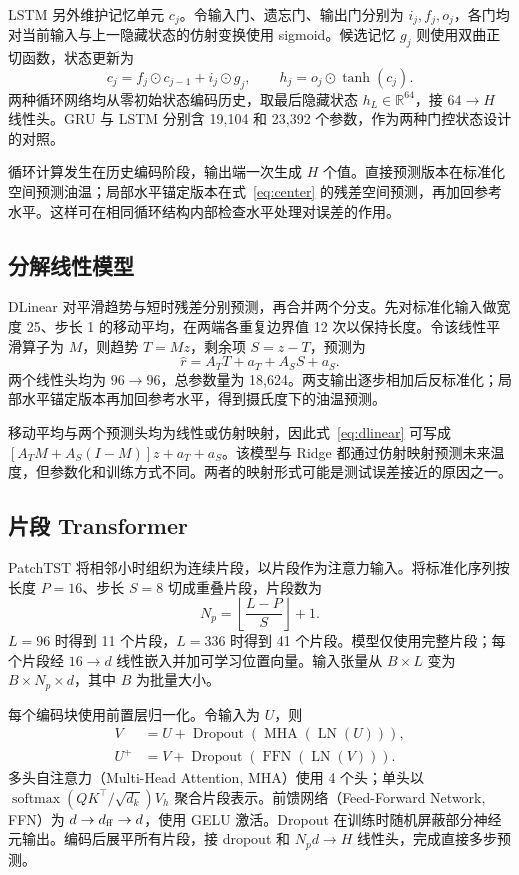 \documentclass[UTF8,a4paper,11pt,fontset=windows]{ctexart}
\begin{document}
LSTM 另外维护记忆单元 $c_j$。令输入门、遗忘门、输出门分别为 $i_j,f_j,o_j$，各门均对当前输入与上一隐藏状态的仿射变换使用 sigmoid。候选记忆 $g_j$ 则使用双曲正切函数，状态更新为
\begin{equation}
c_j=f_j\odot c_{j-1}+i_j\odot g_j,\qquad
h_j=o_j\odot\tanh(c_j).
\end{equation}
两种循环网络均从零初始状态编码历史，取最后隐藏状态 $h_L\in\mathbb R^{64}$，接 $64\to H$ 线性头。GRU 与 LSTM 分别含 19,104 和 23,392 个参数，作为两种门控状态设计的对照。

循环计算发生在历史编码阶段，输出端一次生成 $H$ 个值。直接预测版本在标准化空间预测油温；局部水平锚定版本在式~\eqref{eq:center} 的残差空间预测，再加回参考水平。这样可在相同循环结构内部检查水平处理对误差的作用。

\subsection{分解线性模型}
DLinear 对平滑趋势与短时残差分别预测，再合并两个分支。先对标准化输入做宽度 25、步长 1 的移动平均，在两端各重复边界值 12 次以保持长度。令该线性平滑算子为 $M$，则趋势 $T=Mz$，剩余项 $S=z-T$，预测为
\begin{equation}
\hat r=A_TT+a_T+A_SS+a_S.
\label{eq:dlinear}
\end{equation}
两个线性头均为 $96\to96$，总参数量为 18,624。两支输出逐步相加后反标准化；局部水平锚定版本再加回参考水平，得到摄氏度下的油温预测。

移动平均与两个预测头均为线性或仿射映射，因此式~\eqref{eq:dlinear} 可写成 $[A_TM+A_S(I-M)]z+a_T+a_S$。该模型与 Ridge 都通过仿射映射预测未来温度，但参数化和训练方式不同。两者的映射形式可能是测试误差接近的原因之一。

\subsection{片段 Transformer}
PatchTST 将相邻小时组织为连续片段，以片段作为注意力输入\cite{patchtst2023}。将标准化序列按长度 $P=16$、步长 $S=8$ 切成重叠片段，片段数为
\begin{equation}
N_p=\left\lfloor\frac{L-P}{S}\right\rfloor+1.
\end{equation}
$L=96$ 时得到 11 个片段，$L=336$ 时得到 41 个片段。模型仅使用完整片段；每个片段经 $16\to d$ 线性嵌入并加可学习位置向量。输入张量从 $B\times L$ 变为 $B\times N_p\times d$，其中 $B$ 为批量大小。

每个编码块使用前置层归一化。令输入为 $U$，则
\begin{align}
V&=U+\operatorname{Dropout}(\operatorname{MHA}(\operatorname{LN}(U))),\\
U^+&=V+\operatorname{Dropout}(\operatorname{FFN}(\operatorname{LN}(V))).
\end{align}
多头自注意力（Multi-Head Attention, MHA）使用 4 个头；单头以 $\operatorname{softmax}(QK^\top/\sqrt{d_k})V_h$ 聚合片段表示。前馈网络（Feed-Forward Network, FFN）为 $d\to d_{\rm ff}\to d$，使用 GELU 激活。Dropout 在训练时随机屏蔽部分神经元输出。编码后展平所有片段，接 dropout 和 $N_pd\to H$ 线性头，完成直接多步预测。
\end{document}
